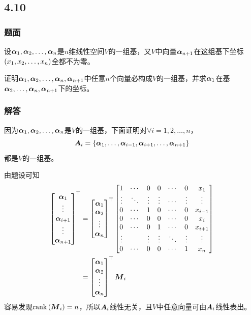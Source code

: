 \documentclass{beamer}
\begin{document}
\subsection*{4.10}
\begin{frame}
    \frametitle{题面}
    设\({\boldsymbol{\alpha}}_1,{\boldsymbol{\alpha}}_2,\dots,{\boldsymbol{\alpha}}_{n}\)是\(n\)维线性空间\(V\)的一组基，又\(V\)中向量\(\boldsymbol{\alpha}_{n+1}\)在这组基下坐标\(\left( {x}_1,{x}_2,\dots,{x}_{n} \right)\)全都不为零。

    证明\({\boldsymbol{\alpha}}_1,{\boldsymbol{\alpha}}_2,\dots,{\boldsymbol{\alpha}}_{n},\boldsymbol{\alpha}_{n+1}\)中任意\(n\)个向量必构成\(V\)的一组基，并求\(\boldsymbol{\alpha}_1\)在基\(\boldsymbol{\alpha}_2,\dots,\boldsymbol{\alpha}_n,\boldsymbol{\alpha}_{n+1}\)下的坐标。
\end{frame}

\begin{frame}[allowframebreaks]
    \frametitle{解答}
    因为\({\boldsymbol{\alpha}}_1,{\boldsymbol{\alpha}}_2,\dots,{\boldsymbol{\alpha}}_{n}\)是\(V\)的一组基，下面证明对\(\forall i=1,2,\dots,n\)，
    \begin{equation*}
        \boldsymbol{A}_i=\left\{\boldsymbol{\alpha}_1,\dots,\boldsymbol{\alpha}_{i-1},\boldsymbol{\alpha}_{i+1},\dots,\boldsymbol{\alpha}_{n+1} \right\}
    \end{equation*}
    都是\(V\)的一组基。

    由题设可知
    \begin{align*}
        \begin{bmatrix}\boldsymbol{\alpha}_1\\\vdots\\\boldsymbol{\alpha}_{i+1}\\\vdots\\\boldsymbol{\alpha}_{n+1}\end{bmatrix}^\top
         & =
        \begin{bmatrix}\boldsymbol{\alpha}_1\\\boldsymbol{\alpha}_2\\\vdots\\\boldsymbol{\alpha}_n\end{bmatrix}^\top
        \begin{bmatrix}
            1      & \cdots & 0      & 0      & \cdots & 0      & x_1     \\
            \vdots & \ddots & \vdots & \vdots & \cdots & \vdots & \vdots  \\
            0      & \cdots & 1      & 0      & \cdots & 0      & x_{i-1} \\
            0      & \cdots & 0      & 0      & \cdots & 0      & x_i     \\
            0      & \cdots & 0      & 1      & \cdots & 0      & x_{i+1} \\
            \vdots &        & \vdots & \vdots & \ddots & \vdots & \vdots  \\
            0      & \cdots & 0      & 0      & \cdots & 1      & x_n
        \end{bmatrix} \\
         & =
        \begin{bmatrix}\boldsymbol{\alpha}_1\\\boldsymbol{\alpha}_2\\\vdots\\\boldsymbol{\alpha}_n\end{bmatrix}^\top\boldsymbol{M}_i
    \end{align*}
    容易发现\(\mathrm{rank}\left( \boldsymbol{M}_i \right)=n\)，所以\(\boldsymbol{A}_i\)线性无关，且\(V\)中任意向量可由\(\boldsymbol{A}_i\)线性表出。


\end{frame}
\end{document}
